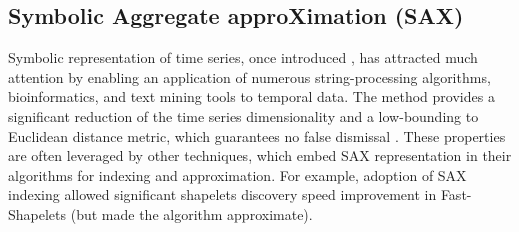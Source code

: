 \documentclass[conference]{IEEEtran}
\begin{document}
\subsection{Symbolic Aggregate approXimation (SAX)}
Symbolic representation of time series, once introduced \cite{sax}, has attracted much attention by
enabling an application of numerous string-processing algorithms, bioinformatics, and text mining 
tools to temporal data. The method provides a significant reduction of the time series 
dimensionality and a low-bounding to Euclidean distance metric, which guarantees no false 
dismissal \cite{hot_sax}.
These properties are often leveraged by other techniques, which embed SAX representation 
in their algorithms for indexing and approximation. For example, adoption of SAX indexing 
allowed significant shapelets discovery speed improvement in Fast-Shapelets \cite{fast-shapelets}
(but made the algorithm approximate).

\end{document}
